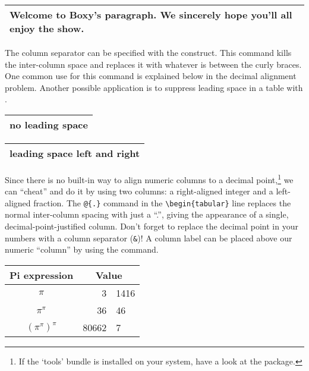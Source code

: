 \begin{example}
\begin{tabular}{|p{4.7cm}|}
\hline
Welcome to Boxy's paragraph.
We sincerely hope you'll 
all enjoy the show.\\
\hline 
\end{tabular}
\end{example}

The column separator can be specified with the 
construct. This command kills the inter-column space and replaces it
with whatever is between the curly braces.  One common use for
this command is explained below in the decimal alignment problem.
Another possible application is to suppress leading space in a table with
.

\begin{example}
\begin{tabular}{@{} l @{}}
\hline 
no leading space\\
\hline
\end{tabular}
\end{example}

\begin{example}
\begin{tabular}{l}
\hline
leading space left and right\\
\hline
\end{tabular}
\end{example}

%
%

 Since there is no built-in way to align
numeric columns to a decimal point,\footnote{If the `tools' bundle is
  installed on your system, have a look at the  package.}
we can ``cheat'' and do it by using two columns: a right-aligned
integer and a left-aligned fraction. The \verb|@{.}| command in the
\verb|\begin{tabular}| line replaces the normal inter-column spacing with
just a ``.'', giving the appearance of a single,
decimal-point-justified column.  Don't forget to replace the decimal
point in your numbers with a column separator (\verb|&|)! A column label
can be placed above our numeric ``column'' by using the
 command.
 
\begin{example}
\begin{tabular}{c r @{.} l}
Pi expression       &
\multicolumn{2}{c}{Value} \\
\hline
$\pi$               & 3&1416  \\
$\pi^{\pi}$         & 36&46   \\
$(\pi^{\pi})^{\pi}$ & 80662&7 \\
\end{tabular}
\end{example}

